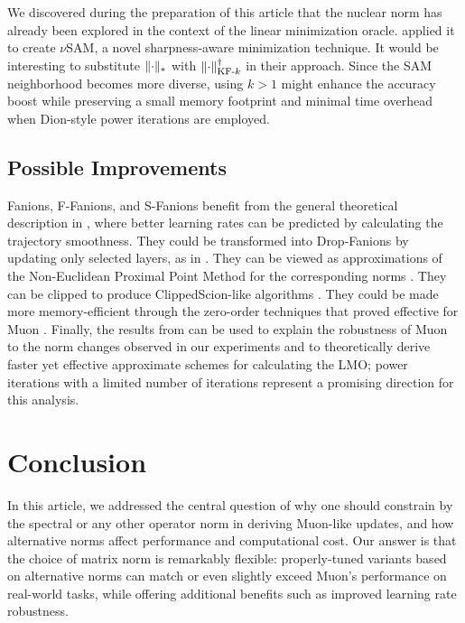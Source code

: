 \documentclass[pmlr]{jmlr}%
\DeclarePairedDelimiter{\normn}{\|}{\|_{*}}
\DeclarePairedDelimiter{\normkfk}{\|}{\|_{\text{KF-}k}}
\begin{document}
 We discovered during the preparation of this article that the nuclear norm has already been explored in the context of the linear minimization oracle. \citep{pethick2025sam} applied it to create $\nu$SAM, a novel sharpness-aware minimization technique. It would be interesting to substitute $\normn{\cdot}$ with $\normkfk{\cdot}^\dagger$ in their approach. Since the SAM neighborhood becomes more diverse, using $k > 1$ might enhance the accuracy boost while preserving a small memory footprint and minimal time overhead when Dion-style power iterations are employed.
 
 \subsection{Possible Improvements}
 
 Fanions, F-Fanions, and S-Fanions benefit from the general theoretical description in \citep{riabinin2025gluon}, where better learning rates can be predicted by calculating the trajectory smoothness. They could be transformed into Drop-Fanions by updating only selected layers, as in \citep{gruntkowska2025dropmuon}. They can be viewed as approximations of the Non-Euclidean Proximal Point Method for the corresponding norms \citep{gruntkowska2025noneuclideanbroximal}. They can be clipped to produce ClippedScion-like algorithms \citep{pethick2025generalizedgradientnormclipping}. They could be made more memory-efficient through the zero-order techniques that proved effective for Muon \citep{petrov2025zeromuon}. Finally, the results from \citep{shulgin2025inexactmuon} can be used to explain the robustness of Muon to the norm changes observed in our experiments and to theoretically derive faster yet effective approximate schemes for calculating the LMO; power iterations with a limited number of iterations represent a promising direction for this analysis.
 
 \section{Conclusion}
 
 In this article, we addressed the central question of why one should constrain by the spectral or any other operator norm in deriving Muon-like updates, and how alternative norms affect performance and computational cost. Our answer is that the choice of matrix norm is remarkably flexible: properly-tuned variants based on alternative norms can match or even slightly exceed Muon's performance on real-world tasks, while offering additional benefits such as improved learning rate robustness.
 
\end{document}
